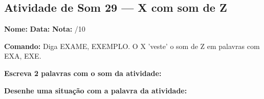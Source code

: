 \subsection{Atividade de Som 29 --- X com som de Z}
\begin{exercicio}



\noindent\textbf{Nome:} \underline{\hspace{3.2cm}} \quad \textbf{Data:} \underline{\hspace{1.6cm}} \quad \textbf{Nota:} \underline{\hspace{0.9cm}}/10


\noindent\textbf{Comando:} Diga EXAME, EXEMPLO. O X 'veste' o som de Z em palavras com EXA, EXE.


\begin{center}
\end{center}

\noindent\textbf{Escreva 2 palavras com o som da atividade:}

\begin{center}
  \underline{\hspace{3cm}} \quad \underline{\hspace{3cm}}
\end{center}

\noindent\textbf{Desenhe uma situação com a palavra da atividade:}

\begin{center}
\end{center}

\end{exercicio}



